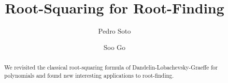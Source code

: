 \documentclass[sigconf]{acmart}
\begin{document}
\title{Root-Squaring for Root-Finding}

\author{Pedro Soto}



\author{Soo Go}
%

%
%
%
%

\renewcommand{\shortauthors}{Soto and Go, et al.}

\begin{abstract}
We revisited the classical root-squaring formula of Dandelin-Lobachevsky-Graeffe for polynomials and found new interesting applications to root-finding.
\end{abstract}
\end{document}
